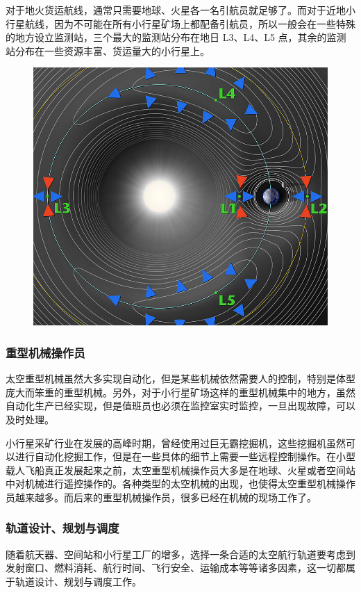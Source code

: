 \documentclass[letterpaper,10pt]{sphinxmanual}
\begin{document}
对于地火货运航线，通常只需要地球、火星各一名引航员就足够了。而对于近地小行星航线，因为不可能在所有小行星矿场上都配备引航员，所以一般会在一些特殊的地方设立监测站，三个最大的监测站分布在地日 L3、L4、L5 点，其余的监测站分布在一些资源丰富、货运量大的小行星上。
\begin{figure}[htbp]
\centering

\includegraphics{800px-Lagrange_points.jpg}
\end{figure}


\subsubsection{重型机械操作员}
\label{profession:id6}
太空重型机械虽然大多实现自动化，但是某些机械依然需要人的控制，特别是体型庞大而笨重的重型机械。另外，对于小行星矿场这样的重型机械集中的地方，虽然自动化生产已经实现，但是值班员也必须在监控室实时监控，一旦出现故障，可以及时处理。

小行星采矿行业在发展的高峰时期，曾经使用过巨无霸挖掘机，这些挖掘机虽然可以进行自动化挖掘工作，但是在一些具体的细节上需要一些远程控制操作。在小型载人飞船真正发展起来之前，太空重型机械操作员大多是在地球、火星或者空间站中对机械进行遥控操作的。各种类型的太空机械的出现，也使得太空重型机械操作员越来越多。而后来的重型机械操作员，很多已经在机械的现场工作了。


\subsubsection{轨道设计、规划与调度}
\label{profession:id7}
随着航天器、空间站和小行星工厂的增多，选择一条合适的太空航行轨道要考虑到发射窗口、燃料消耗、航行时间、飞行安全、运输成本等等诸多因素，这一切都属于轨道设计、规划与调度工作。
\end{document}
